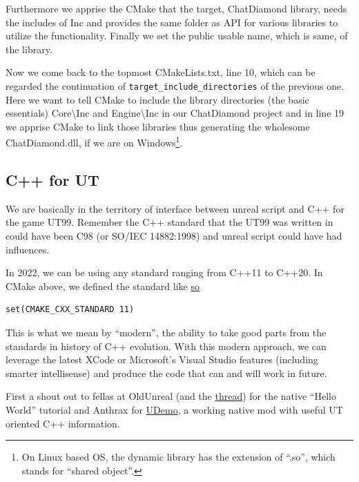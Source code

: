 \documentclass{article}
\theoremstyle{definition}
\newcommand{\FileColor}[1]{{\color{Purple} #1}}
\newcommand{\FolderColor}[1]{{\color{mygray} #1}}
\begin{document}
Furthermore we apprise the CMake that the target, ChatDiamond library, needs the includes of \FolderColor{Inc} and provides the same folder as API for various libraries to utilize the functionality.  Finally we set the public usable name, which is same, of the library.

Now we come back to the topmost \FileColor{CMakeLists.txt}, line 10, which can be regarded the continuation of \texttt{target\_include\_directories} of the previous one.  Here we want to tell CMake to include the library directories (the basic essentials) \FolderColor{Core\textbackslash Inc} and \FolderColor{Engine\textbackslash Inc} in our ChatDiamond project and in line 19 we apprise CMake to link those libraries thus generating the wholesome \FileColor{ChatDiamond.dll}, if we are on Windows\footnote{On Linux based OS, the dynamic library has the extension of ``.so'', which stands for ``shared object''.}.

\subsection{C++ for UT}
We are basically in the territory of interface between unreal script and C++ for the game UT99.  Remember the C++ standard that the UT99 was written in could have been C98 (or SO/IEC 14882:1998) and unreal script could have had influences.

In 2022, we can be using any standard ranging from C++11 to C++20.  In CMake above, we defined the standard like \href{https://github.com/ravimohan1991/ChatDiamond/blob/f7950b2591b93a54600459ec58d7ddf57fe9218d/UTNativeEssentials/CMakeLists.txt#L11}{so}

\lstset{language=[5.0]Lua}
\begin{lstlisting}[frame=single]
set(CMAKE_CXX_STANDARD 11)
\end{lstlisting}

This is what we mean by ``modern'', the ability to take good parts from the standards in history of C++ evolution.  With this modern approach, we can leverage the latest  XCode or Microsoft's Visual Studio features (including smarter intellisense) and produce the code that can and will work in future. 

First a shout out to fellas at OldUnreal (and the \href{https://www.oldunreal.com/phpBB3/viewtopic.php?f=37&t=3938}{thread}) for the native ``Hello World'' tutorial and Anthrax for \href{https://github.com/stijn-volckaert/udemo}{UDemo}, a working native mod with useful UT oriented C++ information.
\end{document}
